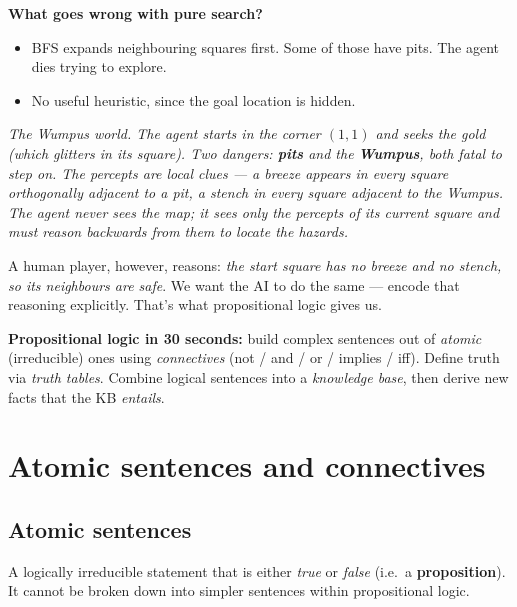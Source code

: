 \documentclass[11pt, a4paper]{article}
\begin{document}
\textbf{What goes wrong with pure search?}
\begin{itemize}
  \item BFS expands neighbouring squares first. Some of those have pits. The agent dies trying to explore.
  \item No useful heuristic, since the goal location is hidden.
\end{itemize}

\begin{center}

\footnotesize\textit{The Wumpus world. The agent starts in the corner $(1,1)$ and seeks the gold (which \emph{glitters} in its square). Two dangers: \textbf{pits} and the \textbf{Wumpus}, both fatal to step on. The percepts are local clues — a \emph{breeze} appears in every square orthogonally adjacent to a pit, a \emph{stench} in every square adjacent to the Wumpus. The agent never sees the map; it sees only the percepts of its current square and must \emph{reason} backwards from them to locate the hazards.}
\end{center}

A human player, however, reasons: \emph{the start square has no breeze and no stench, so its neighbours are safe}. We want the AI to do the same — encode that reasoning explicitly. That's what propositional logic gives us.

\textbf{Propositional logic in 30 seconds:} build complex sentences out of \emph{atomic} (irreducible) ones using \emph{connectives} (not / and / or / implies / iff). Define truth via \emph{truth tables}. Combine logical sentences into a \emph{knowledge base}, then derive new facts that the KB \emph{entails}.

\section{Atomic sentences and connectives}

\subsection{Atomic sentences}

\begin{defbox}
A logically irreducible statement that is either \emph{true} or \emph{false} (i.e.\ a \textbf{proposition}). It cannot be broken down into simpler sentences within propositional logic.
\end{defbox}
\end{document}
